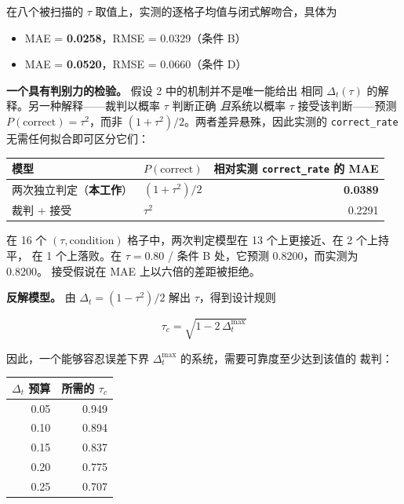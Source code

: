 在八个被扫描的 $\tau$ 取值上，实测的逐格子均值与闭式解吻合，具体为

\begin{itemize}
  \item MAE = \textbf{0.0258}，RMSE = 0.0329（条件 B）
  \item MAE = \textbf{0.0520}，RMSE = 0.0660（条件 D）
\end{itemize}

\textbf{一个具有判别力的检验。} 假设 2 中的机制并不是唯一能给出
相同 $\Delta_t(\tau)$ 的解释。另一种解释——裁判以概率 $\tau$ 判断正确
\textit{且}系统以概率 $\tau$ 接受该判断——预测
$P(\text{correct}) = \tau^2$，而非 $(1+\tau^2)/2$。两者差异悬殊，因此实测的
\texttt{correct\_rate} 无需任何拟合即可区分它们：

\begin{center}
\small
\begin{tabular}{@{}llr@{}}
  \toprule
  模型 & $P(\text{correct})$ & 相对实测 \texttt{correct\_rate} 的 MAE \\
  \midrule
  两次独立判定（\textbf{本工作}） & $(1 + \tau^2)/2$ & \textbf{0.0389} \\
  裁判 + 接受 & $\tau^2$ & 0.2291 \\
  \bottomrule
\end{tabular}
\end{center}

在 16 个 $(\tau, \text{condition})$ 格子中，两次判定模型在 13 个上更接近、在 2 个上持平，
在 1 个上落败。在 $\tau = 0.80$ / 条件 B 处，它预测 0.8200，而实测为 0.8200。
接受假说在 MAE 上以六倍的差距被拒绝。

\textbf{反解模型。} 由 $\Delta_t = (1 - \tau^2)/2$ 解出 $\tau$，得到设计规则

\[
  \tau_c = \sqrt{1 - 2\,\Delta_t^{\max}}
\]

因此，一个能够容忍误差下界 $\Delta_t^{\max}$ 的系统，需要可靠度至少达到该值的
裁判：

\begin{center}
\small
\begin{tabular}{@{}rr@{}}
  \toprule
  $\Delta_t$ 预算 & 所需的 $\tau_c$ \\
  \midrule
  0.05 & 0.949 \\
  0.10 & 0.894 \\
  0.15 & 0.837 \\
  0.20 & 0.775 \\
  0.25 & 0.707 \\
  \bottomrule
\end{tabular}
\end{center}

